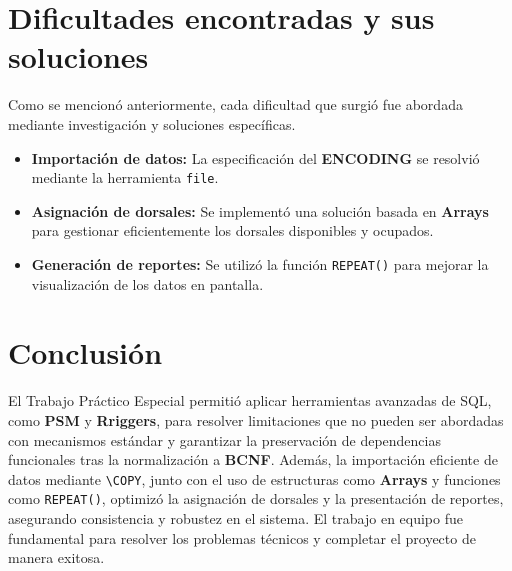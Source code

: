 \documentclass{article}
\begin{document}
\section{Dificultades encontradas y sus soluciones}

Como se mencionó anteriormente, cada dificultad que surgió fue abordada mediante investigación y soluciones específicas.

\begin{itemize}[leftmargin=*]
    \item \textbf{Importación de datos:} La especificación del \textbf{ENCODING} se resolvió mediante la herramienta \texttt{file}.
    \item \textbf{Asignación de dorsales:} Se implementó una solución basada en \textbf{Arrays} para gestionar eficientemente los dorsales disponibles y ocupados.
    \item \textbf{Generación de reportes:} Se utilizó la función \texttt{REPEAT()} para mejorar la visualización de los datos en pantalla.
\end{itemize}

\section{Conclusión}

El Trabajo Práctico Especial permitió aplicar herramientas avanzadas de SQL, como \textbf{PSM} y \textbf{Rriggers}, para resolver limitaciones que no pueden ser abordadas con mecanismos estándar y garantizar la preservación de dependencias funcionales tras la normalización a \textbf{BCNF}. Además, la importación eficiente de datos mediante \texttt{\textbackslash COPY}, junto con el uso de estructuras como \textbf{Arrays} y funciones como \texttt{REPEAT()}, optimizó la asignación de dorsales y la presentación de reportes, asegurando consistencia y robustez en el sistema. El trabajo en equipo fue fundamental para resolver los problemas técnicos y completar el proyecto de manera exitosa.
\end{document}
